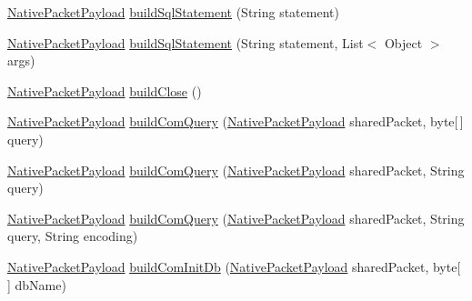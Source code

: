 \begin{DoxyCompactItemize}
\item 
\mbox{\hyperlink{classcom_1_1mysql_1_1cj_1_1protocol_1_1a_1_1_native_packet_payload}{Native\+Packet\+Payload}} \mbox{\hyperlink{classcom_1_1mysql_1_1cj_1_1protocol_1_1a_1_1_native_message_builder_ab1496adef336023770d4c587bdd4af49}{build\+Sql\+Statement}} (String statement)
\item 
\mbox{\hyperlink{classcom_1_1mysql_1_1cj_1_1protocol_1_1a_1_1_native_packet_payload}{Native\+Packet\+Payload}} \mbox{\hyperlink{classcom_1_1mysql_1_1cj_1_1protocol_1_1a_1_1_native_message_builder_a14aff33bdb019a2620a4dc8939fef409}{build\+Sql\+Statement}} (String statement, List$<$ Object $>$ args)
\item 
\mbox{\hyperlink{classcom_1_1mysql_1_1cj_1_1protocol_1_1a_1_1_native_packet_payload}{Native\+Packet\+Payload}} \mbox{\hyperlink{classcom_1_1mysql_1_1cj_1_1protocol_1_1a_1_1_native_message_builder_abf38281f5fca836c56d94270cad2fcde}{build\+Close}} ()
\item 
\mbox{\hyperlink{classcom_1_1mysql_1_1cj_1_1protocol_1_1a_1_1_native_packet_payload}{Native\+Packet\+Payload}} \mbox{\hyperlink{classcom_1_1mysql_1_1cj_1_1protocol_1_1a_1_1_native_message_builder_a21eee4223ad0820046d995ea0635da81}{build\+Com\+Query}} (\mbox{\hyperlink{classcom_1_1mysql_1_1cj_1_1protocol_1_1a_1_1_native_packet_payload}{Native\+Packet\+Payload}} shared\+Packet, byte\mbox{[}$\,$\mbox{]} query)
\item 
\mbox{\hyperlink{classcom_1_1mysql_1_1cj_1_1protocol_1_1a_1_1_native_packet_payload}{Native\+Packet\+Payload}} \mbox{\hyperlink{classcom_1_1mysql_1_1cj_1_1protocol_1_1a_1_1_native_message_builder_a7e10e1d906ee80a3be98a71055632aab}{build\+Com\+Query}} (\mbox{\hyperlink{classcom_1_1mysql_1_1cj_1_1protocol_1_1a_1_1_native_packet_payload}{Native\+Packet\+Payload}} shared\+Packet, String query)
\item 
\mbox{\hyperlink{classcom_1_1mysql_1_1cj_1_1protocol_1_1a_1_1_native_packet_payload}{Native\+Packet\+Payload}} \mbox{\hyperlink{classcom_1_1mysql_1_1cj_1_1protocol_1_1a_1_1_native_message_builder_a156599210c7a0b973033773459f512e3}{build\+Com\+Query}} (\mbox{\hyperlink{classcom_1_1mysql_1_1cj_1_1protocol_1_1a_1_1_native_packet_payload}{Native\+Packet\+Payload}} shared\+Packet, String query, String encoding)
\item 
\mbox{\hyperlink{classcom_1_1mysql_1_1cj_1_1protocol_1_1a_1_1_native_packet_payload}{Native\+Packet\+Payload}} \mbox{\hyperlink{classcom_1_1mysql_1_1cj_1_1protocol_1_1a_1_1_native_message_builder_aa06ab51c766e8a90f768a27b272c05f0}{build\+Com\+Init\+Db}} (\mbox{\hyperlink{classcom_1_1mysql_1_1cj_1_1protocol_1_1a_1_1_native_packet_payload}{Native\+Packet\+Payload}} shared\+Packet, byte\mbox{[}$\,$\mbox{]} db\+Name)

\end{DoxyCompactItemize}
